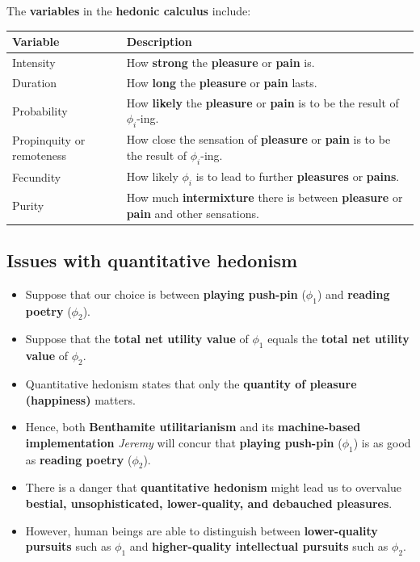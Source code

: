 \documentclass[11pt]{article}
\begin{document}
The \textbf{variables} in the \textbf{hedonic calculus} include:
\begin{center}
\begin{tabular}{|m{5em}|m{25em}|}
\hline
Variable & Description\\
\hline
Intensity & How \textbf{strong} the \textbf{pleasure} or \textbf{pain} is.\\
\hline
Duration & How \textbf{long} the \textbf{pleasure} or \textbf{pain} lasts.\\
\hline
Probability & How \textbf{likely} the \textbf{pleasure} or \textbf{pain} is to be the result of \(\phi_i\)-ing.\\
\hline
Propinquity or remoteness & How close the sensation of \textbf{pleasure} or \textbf{pain} is to be the result of \(\phi_i\)-ing.\\
\hline
Fecundity & How likely \(\phi_i\) is to lead to further \textbf{pleasures} or \textbf{pains}.\\
\hline
Purity & How much \textbf{intermixture} there is between \textbf{pleasure} or \textbf{pain} and other sensations.\\
\hline
\end{tabular}
\end{center}
\subsection{Issues with quantitative hedonism}
\label{sec:orgfa838d7}
\begin{itemize}
\item Suppose that our choice is between \textbf{playing push-pin} (\(\phi_1\)) and \textbf{reading poetry} (\(\phi_2\)).
\item Suppose that the \textbf{total net utility value} of \(\phi_1\) equals the \textbf{total net utility value} of \(\phi_2\).
\item Quantitative hedonism states that only the \textbf{quantity of pleasure (happiness)} matters.
\item Hence, both \textbf{Benthamite utilitarianism} and its \textbf{machine-based implementation} \emph{Jeremy} will concur that \textbf{playing push-pin} (\(\phi_1\)) is as good as \textbf{reading poetry} (\(\phi_2\)).
\item There is a danger that \textbf{quantitative hedonism} might lead us to overvalue \textbf{bestial, unsophisticated, lower-quality, and debauched pleasures}.
\item However, human beings are able to distinguish between \textbf{lower-quality pursuits} such as \(\phi_1\) and \textbf{higher-quality intellectual pursuits} such as \(\phi_2\).
\end{itemize}
\end{document}
